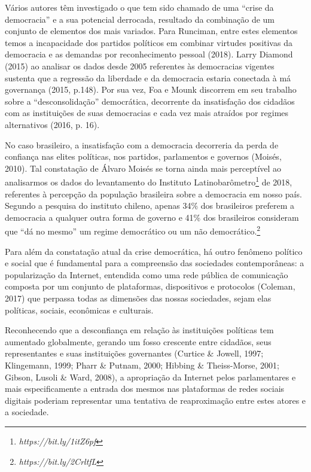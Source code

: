 \noindent{}Vários autores têm investigado o que tem sido chamado de uma ``crise da
democracia'' e a sua potencial derrocada, resultado da combinação de um
conjunto de elementos dos mais variados. Para Runciman, entre estes
elementos temos a incapacidade dos partidos políticos em combinar
virtudes positivas da democracia e as demandas por reconhecimento
pessoal (2018). Larry Diamond (2015) ao analisar os dados desde 2005
referentes às democracias vigentes sustenta que a regressão da liberdade
e da democracia estaria conectada à má governança (2015, p.148). Por sua
vez, Foa e Mounk discorrem em seu trabalho sobre a ``desconsolidação''
democrática, decorrente da insatisfação dos cidadãos com as instituições
de suas democracias e cada vez mais atraídos por regimes alternativos
(2016, p. 16).

No caso brasileiro, a insatisfação com a democracia decorreria da perda
de confiança nas elites políticas, nos partidos, parlamentos e governos
(Moisés, 2010). Tal constatação de Álvaro Moisés se torna ainda mais
perceptível ao analisarmos os dados do levantamento do Instituto
Latinobarômetro\footnote{\emph{https://bit.ly/1itZ6pf}}
de 2018, referentes à percepção da população brasileira sobre a
democracia em nosso país. Segundo a pesquisa do instituto chileno,
apenas 34\% dos brasileiros preferem a democracia a qualquer outra forma
de governo e 41\% dos brasileiros consideram que ``dá no mesmo'' um
regime democrático ou um não democrático.\footnote{\emph{https://bit.ly/2CrltfL}}

Para além da constatação atual da crise democrática, há outro fenômeno
político e social que é fundamental para a compreensão das sociedades
contemporâneas: a popularização da Internet, entendida como uma rede
pública de comunicação composta por um conjunto de plataformas,
dispositivos e protocolos (Coleman, 2017) que perpassa todas as
dimensões das nossas sociedades, sejam elas políticas, sociais,
econômicas e culturais.

Reconhecendo que a desconfiança em relação às instituições políticas tem
aumentado globalmente, gerando um fosso crescente entre cidadãos, seus
representantes e suas instituições governantes (Curtice \& Jowell, 1997;
Klingemann, 1999; Pharr \& Putnam, 2000; Hibbing \& Theiss-Morse, 2001;
Gibson, Lusoli \& Ward, 2008), a apropriação da Internet pelos
parlamentares e mais especificamente a entrada dos mesmos nas
plataformas de redes sociais digitais poderiam representar uma tentativa
de reaproximação entre estes atores e a sociedade.

